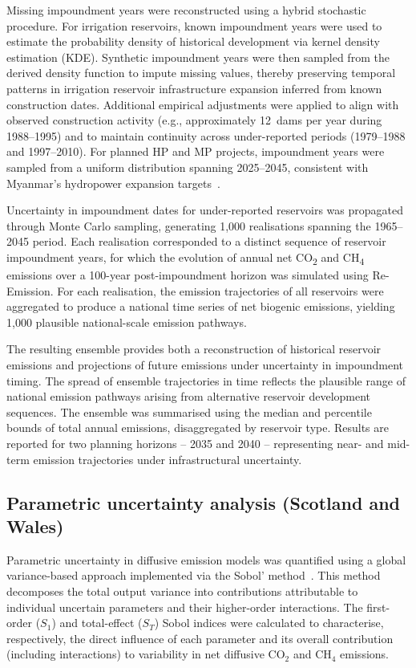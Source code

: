 \documentclass[review, authoryear, 1p]{elsarticle} %
\begin{document}
Missing impoundment years were reconstructed using a hybrid stochastic procedure.
For irrigation reservoirs, known impoundment years were used to estimate the probability density of historical development via kernel density estimation (\acs{KDE}).
Synthetic impoundment years were then sampled from the derived density function to impute missing values, thereby preserving temporal patterns in irrigation reservoir infrastructure expansion inferred from known construction dates.
Additional empirical adjustments were applied to align with observed construction activity (e.g., approximately 12~dams per year during 1988--1995) and to maintain continuity across under-reported periods (1979--1988 and 1997--2010).
For planned \ac{HP} and \ac{MP} projects, impoundment years were sampled from a uniform distribution spanning 2025--2045, consistent with Myanmar's hydropower expansion targets~\citep{Aung2020}.

Uncertainty in impoundment dates for under-reported reservoirs was propagated through Monte Carlo sampling, generating 1,000 realisations spanning the 1965--2045 period.
Each realisation corresponded to a distinct sequence of reservoir impoundment years, for which the evolution of annual net CO\textsubscript{2} and CH\textsubscript{4} emissions over a 100-year post-impoundment horizon was simulated using Re-Emission.
For each realisation, the emission trajectories of all reservoirs were aggregated to produce a national time series of net biogenic emissions, yielding 1,000 plausible national-scale emission pathways.

The resulting ensemble provides both a reconstruction of historical reservoir emissions and projections of future emissions under uncertainty in impoundment timing.
The spread of ensemble trajectories in time reflects the plausible range of national emission pathways arising from alternative reservoir development sequences.
The ensemble was summarised using the median and percentile bounds of total annual emissions, disaggregated by reservoir type.
Results are reported for two planning horizons -- 2035 and 2040 -- representing near- and mid-term emission trajectories under infrastructural uncertainty.

\subsection{Parametric uncertainty analysis (Scotland and Wales)}

Parametric uncertainty in diffusive emission models was quantified using a global variance-based approach implemented via the Sobol' method~\citep{Sobol2001}.
This method decomposes the total output variance into contributions attributable to individual uncertain parameters and their higher-order interactions.
The first-order ($S_1$) and total-effect ($S_T$) Sobol indices were calculated to characterise, respectively, the direct influence of each parameter and its overall contribution (including interactions) to variability in net diffusive CO$_2$ and CH$_4$ emissions.
\end{document}
